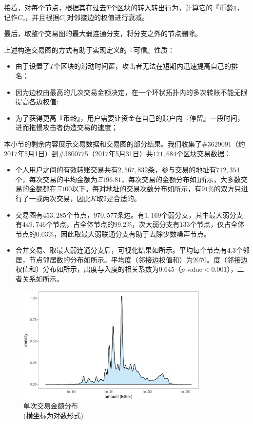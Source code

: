 接着，对每个节点，根据其在过去$T$个区块的转入转出行为，计算它的『币龄』，记作$C_v$，并且根据$C_v$对邻接边的权值进行衰减。

最后，取整个交易图的最大弱连通分支，将分支之外的节点删除。

上述构造交易图的方式有助于实现定义的『可信』性质：
\begin{itemize}
	\item 由于设置了$T$个区块的滑动时间窗，攻击者无法在短期内迅速提高自己的排名；
	\item 因为边权由最高的几次交易金额决定，在一个环状拓扑内的多次转账不能无限提高各边权值;
	\item 为了获得更高『币龄』，用户需要让资金在自己的账户内『停留』一段时间，进而拖慢攻击者伪造交易的速度；
\end{itemize}

本小节的剩余内容展示交易数据和交易图的部分结果。我们收集了\#3629091（约2017年5月1日）到\#3800775（2017年5月31日）共$171,684$个区块交易数据：
\begin{itemize}
	\item 个人用户之间的有效转账交易共有$2,567,832$条，参与交易的地址有$712,354$个，每次交易的平均金额为$\Xi 196.81$，每次交易的金额分布如\ref{fig:txad}所示，大多数交易的金额都在$\Xi 100$以下。每对地址的交易次数分布如所示，有$91\%$的双方只进行了一或两次交易，因此$K$取$2$是合适的。
	\item 交易图有$453,285$个节点，$970,577$条边。有$1,169$个弱分支，其中最大弱分支有$449,746$个节点，占全体节点的$99.2\%$，次大弱分支有$133$个节点，仅占全体节点的$0.03\%$，因此取最大弱联通分支有助于去除少数噪声节点。
	\item 合并交易、取最大弱连通分支后，可视化结果如所示。平均每个节点有$4.3$个邻居，节点邻居数的分布如所示。平均度（邻接边权值和）为$2070$。度（邻接边权值和）分布如所示，出度与入度的相关系数为$0.645$（$p$-value$<0.001$），二者关系如所示。
\end{itemize}

\begin{figure}
	\centering
	\includegraphics[width=0.85\textwidth]{figs/txad.pdf}
	\caption{单次交易金额分布 \\ \small{(横坐标为对数形式)}}\label{fig:txad}
\end{figure}

